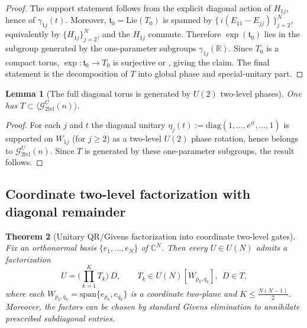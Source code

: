 \documentclass{article}%
\newtheorem{theorem}{Theorem}[section]
\newtheorem{lemma}[theorem]{Lemma}
\theoremstyle{definition}
\numberwithin{equation}{section}
\newcommand{\R}{\mathbb{R}}
\newcommand{\C}{\mathbb{C}}
\newcommand{\diag}{\mathrm{diag}}
\newcommand{\Lie}{\mathrm{Lie}}
\begin{document}
\begin{proof}
The support statement follows from the explicit diagonal action of $H_{1j}$, hence of $\gamma_{1j}(t)$.
Moreover, $\mathfrak{t}_0=\Lie(T_0)$ is spanned by $\{\,i(E_{11}-E_{jj})\,\}_{j=2}^N$, equivalently by $\{H_{1j}\}_{j=2}^N$, and the
$H_{1j}$ commute. Therefore $\exp(\mathfrak{t}_0)$ lies in the subgroup generated by the one-parameter subgroups
$\gamma_{1j}(\R)$. Since $T_0$ is a compact torus, $\exp:\mathfrak{t}_0\to T_0$ is surjective
\cite[Ch.~7]{Hall2015} or \cite[Ch.~IV]{Knapp2002}, giving the claim. The final statement is the decomposition of $T$ into global phase
and special-unitary part.
\end{proof}

\begin{lemma}[The full diagonal torus is generated by $U(2)$ two-level phases]
\label{lem:T_generated_by_U2_two_level_phases_concise}
One has $T\subset \langle \mathcal{G}^{U}_{\mathrm{2lvl}}(n)\rangle$.
\end{lemma}

\begin{proof}
For each $j$ and $t$ the diagonal unitary $\eta_j(t):=\diag(1,\dots,e^{it},\dots,1)$ is supported on $W_{1j}$ (for $j\ge 2$) as a
two-level $U(2)$ phase rotation, hence belongs to $\mathcal{G}^{U}_{\mathrm{2lvl}}(n)$. Since $T$ is generated by these one-parameter
subgroups, the result follows.
\end{proof}

\subsection{Coordinate two-level factorization with diagonal remainder}
\label{subsec:two_level_factorization}

\begin{theorem}[Unitary QR/Givens factorization into coordinate two-level gates]
\label{thm:two_level_factorization_concise}
Fix an orthonormal basis $\{e_1,\dots,e_N\}$ of $\C^N$. Then every $U\in U(N)$ admits a factorization
\begin{equation}\label{eq:U_two_level_factorization_concise}
U=\Big(\prod_{k=1}^{K} T_k\Big)\,D,
\qquad
T_k\in U(N)[W_{p_k,q_k}],\ \ D\in T,
\end{equation}
where each $W_{p_k,q_k}=\mathrm{span}\{e_{p_k},e_{q_k}\}$ is a coordinate two-plane and $K\le \frac{N(N-1)}{2}$.
Moreover, the factors can be chosen by standard Givens elimination to annihilate prescribed subdiagonal entries.
\end{theorem}
\end{document}
